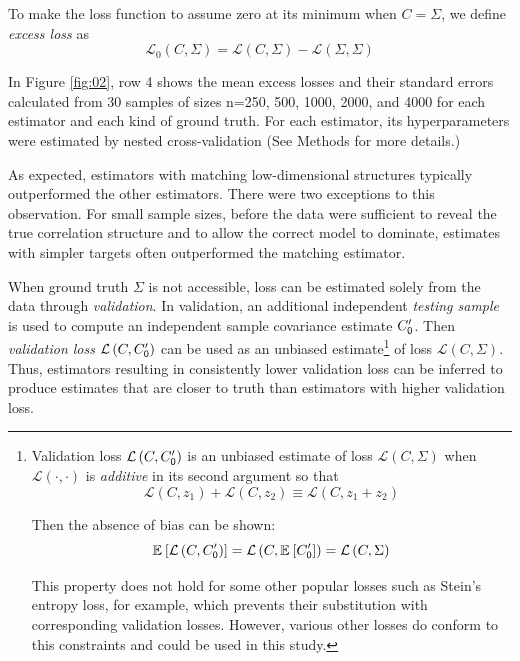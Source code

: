 \documentclass[10pt]{article}
\newcommand{\loss}[1]{\mathcal L\left(#1\right)}
\newcommand{\eloss}[1]{\mathcal L_0\left(#1\right)}
\newcommand{\E}[2][]{\mathbb E_{#1}\left[ #2\right]}    %
\begin{document}
To make the loss function to assume zero at its minimum when $C=\Sigma$, we define \emph{excess loss} as
\begin{equation}\label{eq:excess-loss}
    \eloss{C,\Sigma} = \loss{C,\Sigma}-\loss{\Sigma,\Sigma}
\end{equation}

In Figure \ref{fig:02}, row 4 shows the mean excess losses and their standard errors calculated from 30 samples of sizes n=250, 500, 1000, 2000, and 4000 for each estimator and each kind of ground truth. For each estimator, its hyperparameters were estimated by nested cross-validation (See Methods for more details.)

As expected, estimators with matching low-dimensional structures typically outperformed the other estimators. There were two exceptions to this observation. For small sample sizes, before the data were sufficient to reveal the true correlation structure and to  allow the correct model to dominate, estimates with simpler targets often outperformed the matching estimator.

When ground truth $\Sigma$ is not accessible, loss can be estimated solely from the data through \emph{validation}.  In validation, an additional independent \emph{testing sample} is used to compute an independent sample covariance estimate $C_{\sf 0}^\prime$.  Then \emph{validation loss} $\loss{C,C_{\sf 0}^\prime}$ can be used as an unbiased estimate\footnote
{
    Validation loss $\loss{C,C_{\sf 0}^\prime}$ is an unbiased estimate of loss $\loss{C,\Sigma}$ when $\loss{\cdot,\cdot}$ is \emph{additive} in its second argument so that 
 \begin{equation*}\label{eq:additivity}
 \loss{C,z_1} + \loss{C,z_2} \equiv \loss{C,z_1+z_2}
 \end{equation*}

Then the absence of bias can be shown:
\begin{equation*}
    \E{\loss{C,C_{\sf 0}^\prime}}=\loss{C,\E{C_{\sf 0}^\prime}}=\loss{C,\Sigma}
\end{equation*}

This property does not hold for some other popular losses such as Stein's entropy loss, for example, which prevents their substitution with corresponding validation losses. However, various other losses do conform to this constraints and could be used in this study.
} 
of loss $\loss{C,\Sigma}$.  Thus, estimators resulting in consistently lower validation loss can be inferred to produce estimates that are closer to truth than estimators with higher validation loss. 
\end{document}
